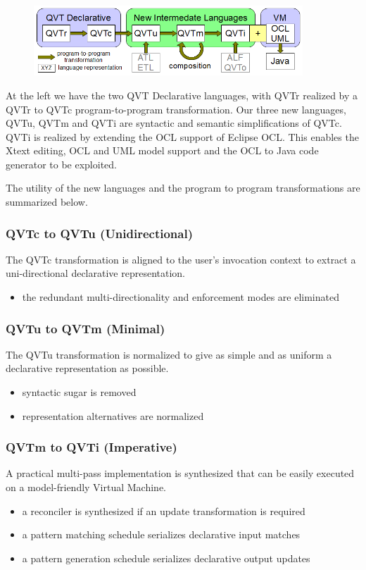 \documentclass{llncs}
\begin{document}
\begin{figure}[h]
	\centering
	\includegraphics[width=0.9\textwidth]{QVThorizontalAlphabet.png}
	\label{fig:overview}
\end{figure}

At the left we have the two QVT Declarative languages, with QVTr realized by a QVTr to QVTc program-to-program transformation. Our three new languages, QVTu, QVTm and QVTi are syntactic and semantic simplifications of QVTc. QVTi is realized by extending the OCL support of Eclipse OCL. This enables the Xtext editing, OCL and UML model support and the OCL to Java code generator to be exploited.

The utility of the new languages and the program to program transformations are summarized below.

\subsubsection{QVTc to QVTu (Unidirectional)}
The QVTc transformation is aligned to the user's invocation context to extract a uni-directional declarative representation.
\begin{itemize}
\item the redundant multi-directionality and enforcement modes are eliminated
\end{itemize}

\subsubsection{QVTu to QVTm (Minimal)}
The QVTu transformation is normalized to give as simple and as uniform a declarative representation as possible.
\begin{itemize}
\item syntactic sugar is removed
\item representation alternatives are normalized
\end{itemize}

\subsubsection{QVTm to QVTi (Imperative)}
A practical multi-pass implementation is synthesized that can be easily executed on a model-friendly Virtual Machine.
\begin{itemize}
\item a reconciler is synthesized if an update transformation is required
\item a pattern matching schedule serializes declarative input matches
\item a pattern generation schedule serializes declarative output updates 
\end{itemize}
\end{document}
